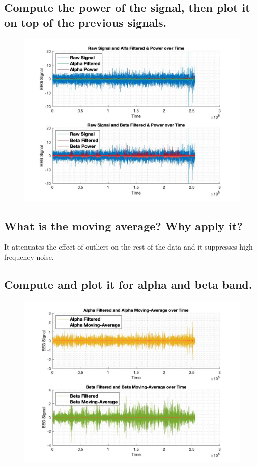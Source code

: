 \documentclass[12pt]{article}
\begin{document}
\subsection{Compute the power of the signal, then plot it on top of the previous signals.}
\begin{figure}[!htb]
    \includegraphics[scale=0.4]{power_1}
\end{figure}

\subsection{What is the moving average? Why apply it?}
It attenuates the effect of outliers on the rest of the data and it suppresses high frequency noise.\clearpage

\subsection{Compute and plot it for alpha and beta band.}
\begin{figure}[!htb]
    \includegraphics[scale=0.4]{mov_avg}
\end{figure}
\end{document}

